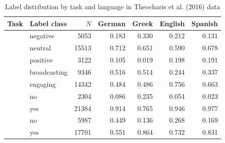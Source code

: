 \begin{table}[!t]

\caption{\label{tab:label_distribution_by_lang_theocharis_et_al_2016}Label distribution by task and language in Theocharis et al. (2016) data}
\centering
\fontsize{10}{12}\selectfont
\begin{tabular}[t]{>{\raggedright\arraybackslash}L{1.5in}lrrrrr}
\toprule
\headrow Task & Label class & $N$ & German & Greek & English & Spanish\\
\midrule
 & negative & 5053 & 0.183 & 0.330 & 0.212 & 0.131\\

 & neutral & 15513 & 0.712 & 0.651 & 0.590 & 0.678\\

 & positive & 3122 & 0.105 & 0.019 & 0.198 & 0.191\\
 & broadcasting & 9346 & 0.516 & 0.514 & 0.244 & 0.337\\

 & engaging & 14342 & 0.484 & 0.486 & 0.756 & 0.663\\
 & no & 2304 & 0.086 & 0.235 & 0.054 & 0.023\\

 & yes & 21384 & 0.914 & 0.765 & 0.946 & 0.977\\
 & no & 5987 & 0.449 & 0.136 & 0.268 & 0.169\\

 & yes & 17701 & 0.551 & 0.864 & 0.732 & 0.831\\
\bottomrule
\end{tabular}
\end{table}
